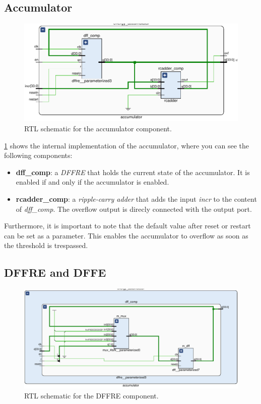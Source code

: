 \subsection{Accumulator}
\begin{figure}[]
  \centering
  \includegraphics[width=\textwidth]{figs/accumulator_schematic.pdf}
  \caption{RTL schematic for the accumulator component.}
  \label{fig:accumulator}
\end{figure}

\cref{fig:accumulator} shows the internal implementation of the accumulator, where you 
can see the following components:
\begin{itemize}
  \item \textbf{dff\_comp}: a \emph{DFFRE} that holds the current state of the 
    accumulator. It is enabled if and only if the accumulator is enabled.
  \item \textbf{rcadder\_comp}: a \emph{ripple-carry adder} that adds the input
    \emph{incr} to the content of \emph{dff\_comp}. The overflow output is 
    direcly connected with the output port.
\end{itemize}

Furthermore, it is important to note that the default value after reset 
or restart can be set as a parameter. 
This enables the accumulator to overflow as soon as the threshold is trespassed.

\subsection{DFFRE and DFFE}
\begin{figure}[]
  \centering
  \includegraphics[width=\textwidth]{figs/dffre_schematic.pdf}
  \caption{RTL schematic for the DFFRE component.}
  \label{fig:dffre}
\end{figure}

